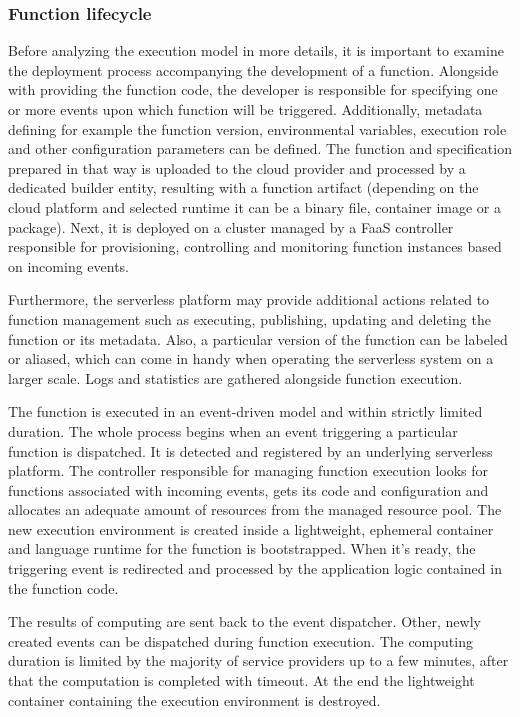 \subsubsection*{Function lifecycle}


Before analyzing the execution model in more details, it is important to examine the deployment process accompanying the development of a function. Alongside with providing the function code, the developer is responsible for specifying one or more events upon which function will be triggered. Additionally, metadata defining for example the function version, environmental variables, execution role and other configuration parameters can be defined. The function and specification prepared in that way is uploaded to the cloud provider and processed by a dedicated builder entity, resulting with a function artifact (depending on the cloud platform and selected runtime it can be a binary file, container image or a package). Next, it is deployed on a cluster managed by a FaaS controller responsible for provisioning, controlling and monitoring function instances based on incoming events.

Furthermore, the serverless platform may provide additional actions related to function management such as executing, publishing, updating and deleting the function or its metadata. Also, a particular version of the function can be labeled or aliased, which can come in handy when operating the serverless system on a larger scale. Logs and statistics are gathered alongside function execution.

The function is executed in an event-driven model and within strictly limited duration. The whole process begins when an event triggering a particular function is dispatched. It is detected and registered by an underlying serverless platform. The controller responsible for managing function execution looks for functions associated with incoming events, gets its code and configuration and allocates an adequate amount of resources from the managed resource pool. The new execution environment is created inside a lightweight, ephemeral container and language runtime for the function is bootstrapped. When it's ready, the triggering event is redirected and processed by the application logic contained in the function code.

The results of computing are sent back to the event dispatcher. Other, newly created events can be dispatched during function execution. The computing duration is limited by the majority of service providers up to a few minutes, after that the computation is completed with timeout. At the end the lightweight container containing the execution environment is destroyed.

